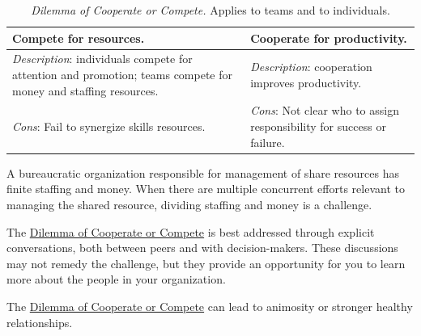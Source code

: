 \begin{center}
\begin{table}[H] %
\begin{tabular}{ | m{\dilemmatablewidth}| m{\dilemmatablewidth} | } 
  \hline
  \textbf{Compete for resources.} &
  \textbf{Cooperate for productivity.} \\
  \hline
  \textit{Description}: individuals compete for attention and promotion; teams compete for money and staffing resources. &
  \textit{Description}: cooperation improves productivity. \\  
  \hline
  \textit{Cons}: Fail to synergize skills resources. & 
  \textit{Cons}: Not clear who to assign responsibility for success or failure. \\
  \hline
\end{tabular}
\caption{
\textit{Dilemma of Cooperate or Compete.} 
Applies to teams and to individuals. 
}
\label{table:dilemma-personal-cooperate-vs-compete}
\end{table}
\end{center}


A bureaucratic organization responsible for management of share resources has finite staffing and money. When there are multiple concurrent efforts relevant to managing the shared resource,  dividing staffing and money is a challenge. 

The \hyperref[table:dilemma-personal-cooperate-vs-compete]{Dilemma of Cooperate or Compete} is best addressed through explicit conversations, both between peers and with decision-makers. These discussions may not remedy the challenge, but they provide an opportunity for you to learn more about the people in your organization.

The \hyperref[table:dilemma-personal-cooperate-vs-compete]{Dilemma of Cooperate or Compete} can lead to animosity or stronger healthy relationships. 



